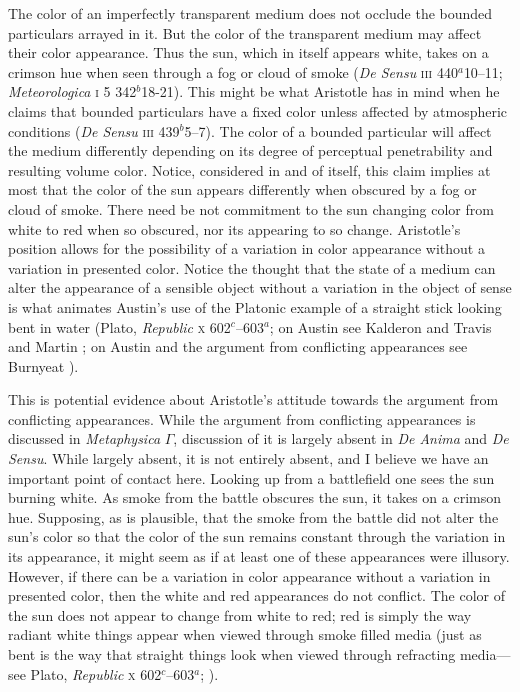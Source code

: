 \documentclass[12pt]{article}
\begin{document}
The color of an imperfectly transparent medium does not occlude the bound\-ed particulars arrayed in it. But the color of the transparent medium may affect their color appearance. Thus the sun, which in itself appears white, takes on a crimson hue when seen through a fog or cloud of smoke (\emph{De Sensu} \textsc{iii} 440\( ^{a} \)10--11; \emph{Meteorologica} \textsc{i} 5 342\( ^{b} \)18-21). This might be what Aristotle has in mind when he claims that bounded particulars have a fixed color unless affected by atmospheric conditions (\emph{De Sensu} \textsc{iii} 439\( ^{b} \)5--7). The color of a bounded particular will affect the medium differently depending on its degree of perceptual penetrability and resulting volume color. Notice, considered in and of itself, this claim implies at most that the color of the sun appears differently when obscured by a fog or cloud of smoke. There need be not commitment to the sun changing color from white to red when so obscured, nor its appearing to so change. Aristotle's position allows for the possibility of a variation in color appearance without a variation in presented color. Notice the thought that the state of a medium can alter the appearance of a sensible object without a variation in the object of sense is what animates Austin's \citeyearpar{Austin:1962lr} use of the Platonic example of a straight stick looking bent in water (Plato, \emph{Republic} \textsc{x} 602\( ^{c} \)--603\( ^{a} \); on Austin see Kalderon and Travis \citeyear{Kalderon:2010fk} and Martin \citeyear{Martin:2000nx}; on Austin and the argument from conflicting appearances see Burnyeat \citeyear{Burnyeat:1979mv}).

This is potential evidence about Aristotle's attitude towards the argument from conflicting appearances. While the argument from conflicting appearances is discussed in \emph{Metaphysica} \( \Gamma \), discussion of it is largely absent in \emph{De Anima} and \emph{De Sensu}. While largely absent, it is not entirely absent, and I believe we have an important point of contact here. Looking up from a battlefield one sees the sun burning white. As smoke from the battle obscures the sun, it takes on a crimson hue. Supposing, as is plausible, that the smoke from the battle did not alter the sun's color so that the color of the sun remains constant through the variation in its appearance, it might seem as if at least one of these appearances were illusory. However, if there can be a variation in color appearance without a variation in presented color, then the white and red appearances do not conflict. The color of the sun does not appear to change from white to red; red is simply the way radiant white things appear when viewed through smoke filled media (just as bent is the way that straight things look when viewed through refracting media---see Plato, \emph{Republic} \textsc{x} 602\( ^{c} \)--603\( ^{a} \); \citealt{Austin:1962lr}). 
\end{document}
